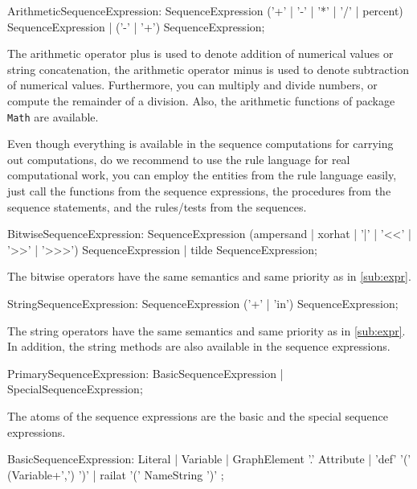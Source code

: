 \begin{rail}
  ArithmeticSequenceExpression:
    SequenceExpression ('+' | '-' | '*' | '/' | percent) SequenceExpression |
		('-' | '+') SequenceExpression;
\end{rail}

The arithmetic operator plus is used to denote addition of numerical values or string concatenation,
the arithmetic operator minus is used to denote subtraction of numerical values.
Furthermore, you can multiply and divide numbers, or compute the remainder of a division.
Also, the arithmetic functions of package \texttt{Math} are available.

Even though everything is available in the sequence computations for carrying out computations, do we recommend to use the rule language for real computational work, you can employ the entities from the rule language easily, just call the functions from the sequence expressions, the procedures from the sequence statements, and the rules/tests from the sequences.

\begin{rail}
  BitwiseSequenceExpression: 
    SequenceExpression (ampersand | xorhat | '|' | '<<' | '>>' | '>>>') SequenceExpression |
    tilde SequenceExpression;
\end{rail}

The bitwise operators have the same semantics and same priority as in \ref{sub:expr}.

\begin{rail}
  StringSequenceExpression: 
    SequenceExpression ('+' | 'in') SequenceExpression;
\end{rail}

The string operators have the same semantics and same priority as in \ref{sub:expr}.
In addition, the string methods are also available in the sequence expressions.

\begin{rail}
  PrimarySequenceExpression:
    BasicSequenceExpression |
    SpecialSequenceExpression;
\end{rail}

The atoms of the sequence expressions are the basic and the special sequence expressions.

\begin{rail}
  BasicSequenceExpression:
    Literal |
    Variable | 
    GraphElement '.' Attribute |
    'def' '(' (Variable+',') ')' |
    railat '(' NameString ')'
  ;
\end{rail}

